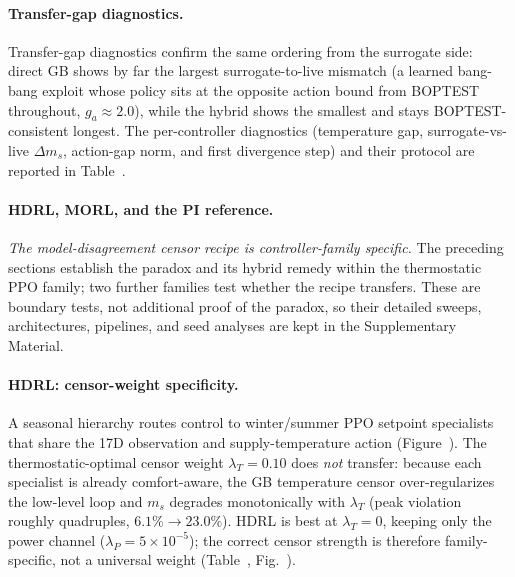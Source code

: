 \paragraph{Transfer-gap diagnostics.}

Transfer-gap diagnostics confirm the same ordering from the surrogate side: direct GB shows by far the largest surrogate-to-live mismatch (a learned bang-bang exploit whose policy sits at the opposite action bound from BOPTEST throughout, $g_a\approx2.0$), while the hybrid shows the smallest and stays BOPTEST-consistent longest. The per-controller diagnostics (temperature gap, surrogate-vs-live $\Delta m_s$, action-gap norm, and first divergence step) and their protocol are reported in Table~.





\paragraph{HDRL, MORL, and the PI reference.}\label{sec:results2-boundary}

\emph{The model-disagreement censor recipe is controller-family specific.} The preceding sections establish the paradox and its hybrid remedy within the thermostatic PPO family; two further families test whether the recipe transfers. These are boundary tests, not additional proof of the paradox, so their detailed sweeps, architectures, pipelines, and seed analyses are kept in the Supplementary Material.

\paragraph{HDRL: censor-weight specificity.} A seasonal hierarchy routes control to winter/summer PPO setpoint specialists that share the 17D observation and supply-temperature action (Figure~). The thermostatic-optimal censor weight $\lambda_T=0.10$ does \emph{not} transfer: because each specialist is already comfort-aware, the GB temperature censor over-regularizes the low-level loop and $m_s$ degrades monotonically with $\lambda_T$ (peak violation roughly quadruples, $6.1\%\to23.0\%$). HDRL is best at $\lambda_T=0$, keeping only the power channel ($\lambda_P=5\times10^{-5}$); the correct censor strength is therefore family-specific, not a universal weight (Table~, Fig.~).

